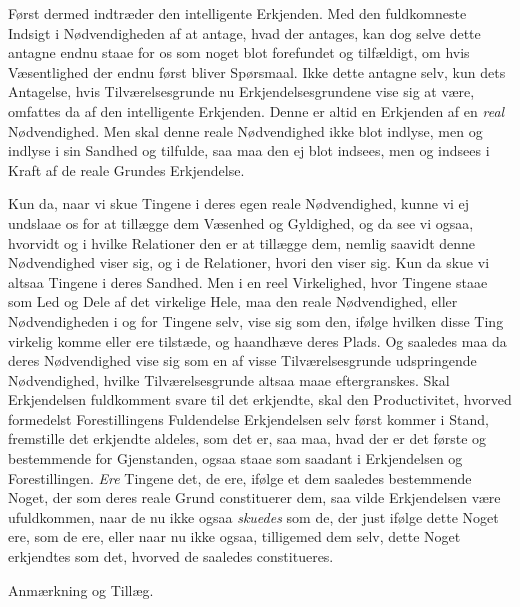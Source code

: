 \documentclass[12pt,a4paper]{book}
\newcommand{\apage}[1]{\marginnote{\footnotesize\textit{[#1]}}}
\begin{document}
Først dermed indtræder den intelligente Erkjenden. Med den fuldkomneste Indsigt i
Nødvendigheden af at antage, hvad der antages, kan dog selve dette antagne endnu
staae for os som noget blot forefundet og tilfældigt, om hvis Væsentlighed der
endnu først bliver Spørsmaal. Ikke dette antagne selv, kun dets Antagelse, hvis
Tilværelsesgrunde nu Erkjendelsesgrundene vise sig at være, omfattes da af den
intelligente Erkjenden. Denne er altid en Erkjenden af en \emph{real}
Nødvendighed. Men skal denne reale Nødvendighed ikke blot indlyse, men og
indlyse i sin Sandhed og tilfulde, saa maa den ej blot indsees, men og indsees i
Kraft af de reale Grundes Erkjendelse.

\apage{73} Kun da, naar vi skue Tingene i deres egen reale Nødvendighed, kunne vi ej
undslaae os for at tillægge dem Væsenhed og Gyldighed, og da see vi ogsaa,
hvorvidt og i hvilke Relationer den er at tillægge dem, nemlig saavidt denne
Nødvendighed viser sig, og i de Relationer, hvori den viser sig. Kun da skue vi
altsaa Tingene i deres Sandhed. Men i en reel Virkelighed, hvor Tingene staae som
Led og Dele af det virkelige Hele, maa den reale Nødvendighed, eller
Nødvendigheden i og for Tingene selv, vise sig som den, ifølge hvilken disse Ting
virkelig komme eller ere tilstæde, og haandhæve deres Plads. Og saaledes maa da
deres Nødvendighed vise sig som en af visse Tilværelsesgrunde udspringende
Nødvendighed, hvilke Tilværelsesgrunde altsaa maae eftergranskes. Skal
Erkjendelsen fuldkomment svare til det erkjendte, skal den Productivitet, hvorved
formedelst Forestillingens Fuldendelse Erkjendelsen selv først kommer i Stand,
fremstille det erkjendte aldeles, som det er, saa maa, hvad der er det første og
bestemmende for Gjenstanden, ogsaa staae som saadant i Erkjendelsen og
Forestillingen. \emph{Ere} Tingene det, de ere, ifølge et dem saaledes bestemmende
Noget, der som deres reale Grund constituerer dem, saa vilde Erkjendelsen være
ufuldkommen, naar de nu ikke ogsaa \emph{skuedes} som de, der just ifølge dette Noget
ere, som de ere, eller naar nu ikke ogsaa, tilligemed dem  \apage{74} selv, dette Noget
erkjendtes som det, hvorved de saaledes constitueres.

\begin{center}Anmærkning og Tillæg.\end{center}
\end{document}

